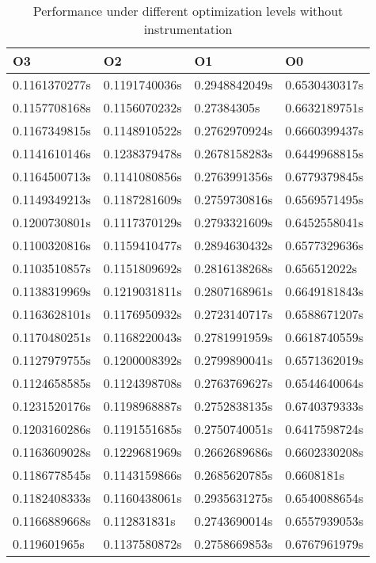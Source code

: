 \begin{table}[]
  \caption{Performance under different optimization levels without instrumentation}
  \label{table:non_instrumented_optimizations_benchmark}
  \begin{tabular}{llll}
    \centering
    O3            & O2            & O1            & O0            \\ \hline
    0.1161370277s & 0.1191740036s & 0.2948842049s & 0.6530430317s \\
    0.1157708168s & 0.1156070232s & 0.27384305s   & 0.6632189751s \\
    0.1167349815s & 0.1148910522s & 0.2762970924s & 0.6660399437s \\
    0.1141610146s & 0.1238379478s & 0.2678158283s & 0.6449968815s \\
    0.1164500713s & 0.1141080856s & 0.2763991356s & 0.6779379845s \\
    0.1149349213s & 0.1187281609s & 0.2759730816s & 0.6569571495s \\
    0.1200730801s & 0.1117370129s & 0.2793321609s & 0.6452558041s \\
    0.1100320816s & 0.1159410477s & 0.2894630432s & 0.6577329636s \\
    0.1103510857s & 0.1151809692s & 0.2816138268s & 0.656512022s  \\
    0.1138319969s & 0.1219031811s & 0.2807168961s & 0.6649181843s \\
    0.1163628101s & 0.1176950932s & 0.2723140717s & 0.6588671207s \\
    0.1170480251s & 0.1168220043s & 0.2781991959s & 0.6618740559s \\
    0.1127979755s & 0.1200008392s & 0.2799890041s & 0.6571362019s \\
    0.1124658585s & 0.1124398708s & 0.2763769627s & 0.6544640064s \\
    0.1231520176s & 0.1198968887s & 0.2752838135s & 0.6740379333s \\
    0.1203160286s & 0.1191551685s & 0.2750740051s & 0.6417598724s \\
    0.1163609028s & 0.1229681969s & 0.2662689686s & 0.6602330208s \\
    0.1186778545s & 0.1143159866s & 0.2685620785s & 0.6608181s    \\
    0.1182408333s & 0.1160438061s & 0.2935631275s & 0.6540088654s \\
    0.1166889668s & 0.112831831s  & 0.2743690014s & 0.6557939053s \\
    0.119601965s  & 0.1137580872s & 0.2758669853s & 0.6767961979s \\

\end{tabular}
\end{table}

